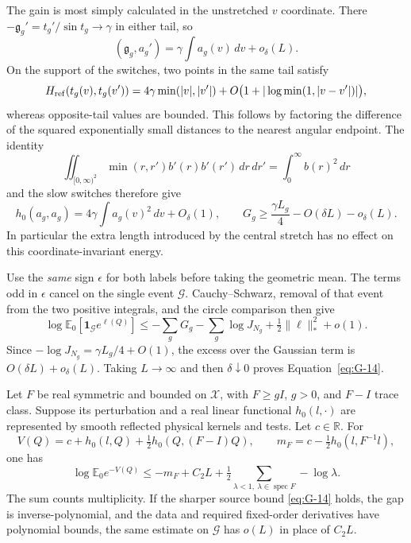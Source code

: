 The gain is most simply calculated in the unstretched $v$ coordinate.
There $-\mathfrak g_g'=t_g'/\sin t_g\to\gamma$ in either tail,
so
\[
 (\mathfrak g_g,a_g')=\gamma\int a_g(v)\,dv+o_\delta(L).
\]
On the support of the switches, two points in the same tail satisfy
\[
 H_{\rm ref}(t_g(v),t_g(v'))
 =4\gamma\min(|v|,|v'|)
   +O\bigl(1+|\log\min(1,|v-v'|)|\bigr),
\]
whereas opposite-tail values are bounded. This follows by factoring
the difference of the squared exponentially small distances to the
nearest angular endpoint. The identity
\[
 \iint_{[0,\infty)^2}\min(r,r')b'(r)b'(r')\,dr\,dr'
       =\int_0^\infty b(r)^2\,dr
\]
and the slow switches therefore give
\[
 h_0(a_g,a_g)=4\gamma\int a_g(v)^2\,dv+O_\delta(1),
 \qquad
 G_g\ge\frac{\gamma L_g}{4}-O(\delta L)-o_\delta(L).
\]
In particular the extra length introduced by the central stretch
has no effect on this coordinate-invariant energy.

Use the \emph{same} sign $\epsilon$ for both labels before taking
the geometric mean. The terms odd in $\epsilon$ cancel on the single
event $\mathcal G$. Cauchy--Schwarz, removal of that event from the
two positive integrals, and the circle comparison then give
\[
 \log\mathbb E_0[\mathbf1_{\mathcal G}e^{\ell(Q)}]
 \le-\sum_gG_g-\sum_g\log J_{N_g}
       +\tfrac12\|\ell\|_*^2+o(1).
\]
Since $-\log J_{N_g}=\gamma L_g/4+O(1)$, the excess over the
Gaussian term is $O(\delta L)+o_\delta(L)$. Taking $L\to\infty$
and then $\delta\downarrow0$ proves Equation~\eqref{eq:G-14}.

\begin{proposition}
\label{prop:quadratic-integration}
Let $F$ be real symmetric and bounded on $\mathcal X$, with
$F\ge gI$, $g>0$, and $F-I$ trace class. Suppose its perturbation
and a real linear functional $h_0(l,\cdot)$ are represented by smooth
reflected physical kernels and tests. Let $c\in\mathbb R$. For
\[
 V(Q)=c+h_0(l,Q)+\tfrac12h_0(Q,(F-I)Q),\qquad
 m_F=c-\tfrac12h_0(l,F^{-1}l),
\]
one has
\begin{equation}\label{eq:G-18}
 \log\mathbb E_0e^{-V(Q)}\le -m_F+C_2L
        +\tfrac12\sum_{\lambda<1,\ \lambda\in\operatorname{spec}F}
                   -\log\lambda.
\end{equation}
The sum counts multiplicity. If the sharper source bound
\eqref{eq:G-14} holds, the gap is inverse-polynomial, and the data
and required fixed-order derivatives have polynomial bounds, the
same estimate on $\mathcal G$ has $o(L)$ in place of $C_2L$.
\end{proposition}

